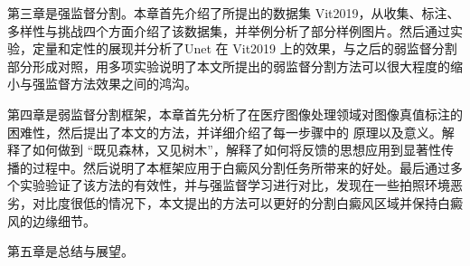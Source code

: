 第三章是强监督分割。本章首先介绍了所提出的数据集 Vit2019，从收集、标注、多样性与挑战四个方面介绍了该数据集，并举例分析了部分样例图片。然后通过实验，定量和定性的展现并分析了Unet 在 Vit2019 上的效果，与之后的弱监督分割部分形成对照，用多项实验说明了本文所提出的弱监督分割方法可以很大程度的缩小与强监督方法效果之间的鸿沟。

第四章是弱监督分割框架，本章首先分析了在医疗图像处理领域对图像真值标注的困难性，然后提出了本文的方法，并详细介绍了每一步骤中的 原理以及意义。解释了如何做到 “既见森林，又见树木”，解释了如何将反馈的思想应用到显著性传播的过程中。然后说明了本框架应用于白癜风分割任务所带来的好处。最后通过多个实验验证了该方法的有效性，并与强监督学习进行对比，发现在一些拍照环境恶劣，对比度很低的情况下，本文提出的方法可以更好的分割白癜风区域并保持白癜风的边缘细节。

第五章是总结与展望。




















